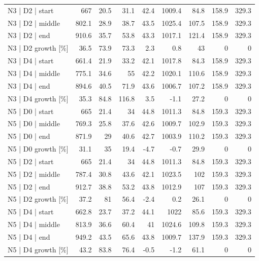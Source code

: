 \begin{tabular}{lrrrrrrrr}
 N3 | D2 | start    &   667   &    20.5 &         31.1 &   42.4 &      1009.4 &        84.8 &  158.9 & 329.3 \\
 N3 | D2 | middle   &   802.1 &    28.9 &         38.7 &   43.5 &      1025.4 &       107.5 &  158.9 & 329.3 \\
 N3 | D2 | end      &   910.6 &    35.7 &         53.8 &   43.3 &      1017.1 &       121.4 &  158.9 & 329.3 \\
 N3 | D2 growth [\%] &    36.5 &    73.9 &         73.3 &    2.3 &         0.8 &        43   &    0   &   0   \\
 N3 | D4 | start    &   661.4 &    21.9 &         33.2 &   42.1 &      1017.8 &        84.3 &  158.9 & 329.3 \\
 N3 | D4 | middle   &   775.1 &    34.6 &         55   &   42.2 &      1020.1 &       110.6 &  158.9 & 329.3 \\
 N3 | D4 | end      &   894.6 &    40.5 &         71.9 &   43.6 &      1006.7 &       107.2 &  158.9 & 329.3 \\
 N3 | D4 growth [\%] &    35.3 &    84.8 &        116.8 &    3.5 &        -1.1 &        27.2 &    0   &   0   \\
 N5 | D0 | start    &   665   &    21.4 &         34   &   44.8 &      1011.3 &        84.8 &  159.3 & 329.3 \\
 N5 | D0 | middle   &   769.3 &    25.8 &         37.6 &   42.6 &      1009.7 &       102.9 &  159.3 & 329.3 \\
 N5 | D0 | end      &   871.9 &    29   &         40.6 &   42.7 &      1003.9 &       110.2 &  159.3 & 329.3 \\
 N5 | D0 growth [\%] &    31.1 &    35   &         19.4 &   -4.7 &        -0.7 &        29.9 &    0   &   0   \\
 N5 | D2 | start    &   665   &    21.4 &         34   &   44.8 &      1011.3 &        84.8 &  159.3 & 329.3 \\
 N5 | D2 | middle   &   787.4 &    30.8 &         43.6 &   42.1 &      1023.5 &       102   &  159.3 & 329.3 \\
 N5 | D2 | end      &   912.7 &    38.8 &         53.2 &   43.8 &      1012.9 &       107   &  159.3 & 329.3 \\
 N5 | D2 growth [\%] &    37.2 &    81   &         56.4 &   -2.4 &         0.2 &        26.1 &    0   &   0   \\
 N5 | D4 | start    &   662.8 &    23.7 &         37.2 &   44.1 &      1022   &        85.6 &  159.3 & 329.3 \\
 N5 | D4 | middle   &   813.9 &    36.6 &         60.4 &   41   &      1024.6 &       109.8 &  159.3 & 329.3 \\
 N5 | D4 | end      &   949.2 &    43.5 &         65.6 &   43.8 &      1009.7 &       137.9 &  159.3 & 329.3 \\
 N5 | D4 growth [\%] &    43.2 &    83.8 &         76.4 &   -0.5 &        -1.2 &        61.1 &    0   &   0   \\
\hline
\end{tabular}